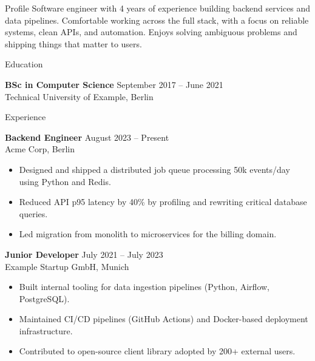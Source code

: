 \documentclass{resume} %
\begin{document}
\begin{rSection}{Profile}
Software engineer with 4 years of experience building backend services and data pipelines.
Comfortable working across the full stack, with a focus on reliable systems, clean APIs,
and automation. Enjoys solving ambiguous problems and shipping things that matter to users.
\end{rSection}

\begin{rSection}{Education}

{\bf BSc in Computer Science} \hfill {September 2017 -- June 2021}\\
Technical University of Example, Berlin

\medskip
\end{rSection}

\begin{rSection}{Experience}

\textbf{Backend Engineer} \hfill {August 2023 -- Present}\\
Acme Corp, Berlin\\
\smallskip
\begin{itemize}[leftmargin=1em, itemsep=-2pt, topsep=4pt]
  \item Designed and shipped a distributed job queue processing 50k events/day using Python and Redis.
  \item Reduced API p95 latency by 40\% by profiling and rewriting critical database queries.
  \item Led migration from monolith to microservices for the billing domain.
\end{itemize}

\medskip

\textbf{Junior Developer} \hfill {July 2021 -- July 2023}\\
Example Startup GmbH, Munich\\
\smallskip
\begin{itemize}[leftmargin=1em, itemsep=-2pt, topsep=4pt]
  \item Built internal tooling for data ingestion pipelines (Python, Airflow, PostgreSQL).
  \item Maintained CI/CD pipelines (GitHub Actions) and Docker-based deployment infrastructure.
  \item Contributed to open-source client library adopted by 200+ external users.
\end{itemize}

\end{rSection}
\end{document}
